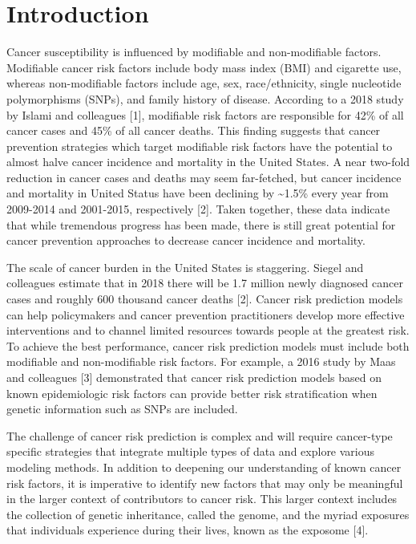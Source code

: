 \documentclass[12pt,oneside]{reedthesis}
\theoremstyle{definition}
\theoremstyle{definition}
\theoremstyle{definition}
\theoremstyle{remark}
\begin{document}
\mainmatter %
\pagestyle{fancyplain} %

\hypertarget{introduction}{%
\section*{Introduction}\label{introduction}}

Cancer susceptibility is influenced by modifiable and non-modifiable
factors. Modifiable cancer risk factors include body mass index (BMI)
and cigarette use, whereas non-modifiable factors include age, sex,
race/ethnicity, single nucleotide polymorphisms (SNPs), and family
history of disease. According to a 2018 study by Islami and colleagues
{[}1{]}, modifiable risk factors are responsible for 42\% of all cancer
cases and 45\% of all cancer deaths. This finding suggests that cancer
prevention strategies which target modifiable risk factors have the
potential to almost halve cancer incidence and mortality in the United
States. A near two-fold reduction in cancer cases and deaths may seem
far-fetched, but cancer incidence and mortality in United Status have
been declining by \textasciitilde{}1.5\% every year from 2009-2014 and
2001-2015, respectively {[}2{]}. Taken together, these data indicate
that while tremendous progress has been made, there is still great
potential for cancer prevention approaches to decrease cancer incidence
and mortality.

The scale of cancer burden in the United States is staggering. Siegel
and colleagues estimate that in 2018 there will be 1.7 million newly
diagnosed cancer cases and roughly 600 thousand cancer deaths {[}2{]}.
Cancer risk prediction models can help policymakers and cancer
prevention practitioners develop more effective interventions and to
channel limited resources towards people at the greatest risk. To
achieve the best performance, cancer risk prediction models must include
both modifiable and non-modifiable risk factors. For example, a 2016
study by Maas and colleagues {[}3{]} demonstrated that cancer risk
prediction models based on known epidemiologic risk factors can provide
better risk stratification when genetic information such as SNPs are
included.

The challenge of cancer risk prediction is complex and will require
cancer-type specific strategies that integrate multiple types of data
and explore various modeling methods. In addition to deepening our
understanding of known cancer risk factors, it is imperative to identify
new factors that may only be meaningful in the larger context of
contributors to cancer risk. This larger context includes the collection
of genetic inheritance, called the genome, and the myriad exposures that
individuals experience during their lives, known as the exposome
{[}4{]}.
\end{document}
